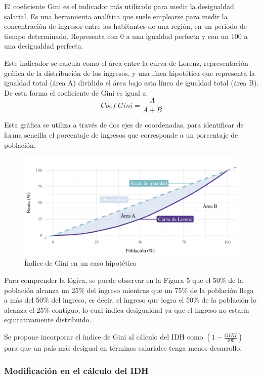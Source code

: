 \documentclass[
  10pt,
]{article}
\begin{document}
El coeficiente Gini es el indicador más utilizado para medir la
desigualdad salarial. Es una herramienta analítica que suele emplearse
para medir la concentración de ingresos entre los habitantes de una
región, en un periodo de tiempo determinado. Representa con 0 a una
igualdad perfecta y con un 100 a una desigualdad perfecta.

Este indicador se calcula como el área entre la curva de Lorenz,
representación gráfica de la distribución de los ingresos, y una línea
hipotética que representa la igualdad total (área A) dividido el área
bajo esta línea de igualdad total (área B). De esta forma el coeficiente
de Gini es igual a: \[Coef\;Gini=\frac{A}{A+B}\]

Esta gráfica se utiliza a través de dos ejes de coordenadas, para
identificar de forma sencilla el porcentaje de ingresos que corresponde
a un porcentaje de población.

\begin{figure}

{\centering \includegraphics{Informe_files/figure-latex/Figura5-1} 

}

\caption{Índice de Gini en un caso hipotético}\label{fig:Figura5}
\end{figure}

Para comprender la lógica, se puede observar en la Figura 5 que el 50\%
de la población alcanza un 25\% del ingreso mientras que un 75\% de la
población llega a más del 50\% del ingreso, es decir, el ingreso que
logra el 50\% de la población lo alcanza el 25\% contiguo, lo cual
indica desigualdad ya que el ingreso no estaría equitativamente
distribuido.

Se propone incorporar el índice de Gini al cálculo del IDH como
\((1-\frac{GINI}{100})\) para que un país más desigual en términos
salariales tenga menos desarrollo.

\subsubsection{Modificación en el cálculo del
IDH}\label{modificaciuxf3n-en-el-cuxe1lculo-del-idh-1}
\end{document}
